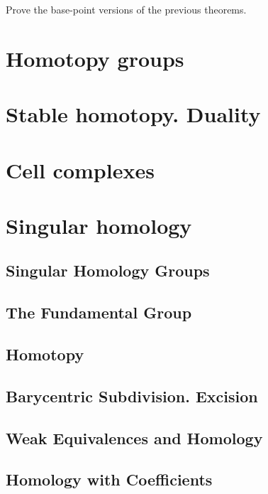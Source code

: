 \documentclass[11pt]{book} %
\begin{document}
\begin{exr}
Prove the base-point versions of the previous theorems.
\end{exr}
\chapter{Homotopy groups}
\chapter{Stable homotopy. Duality}
\chapter{Cell complexes}




\chapter{Singular homology}
\section{Singular Homology Groups}
\section{The Fundamental Group
}

\section{Homotopy
}
\section{Barycentric Subdivision. Excision}
\section{Weak Equivalences and Homology}
\section{Homology with Coefficients}
\end{document}
